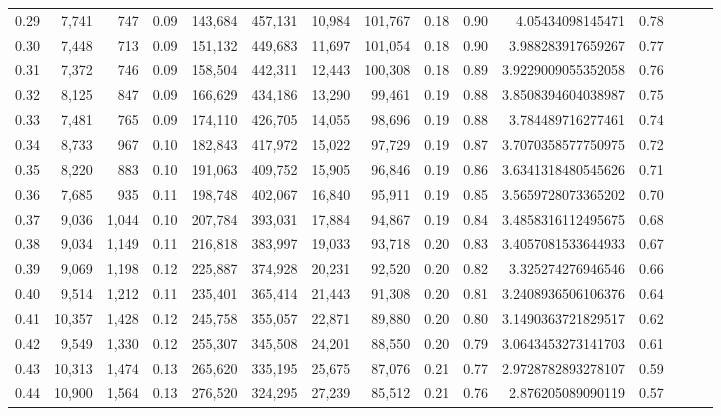 \begin{tabular}{rrrrrrrrrrrrrrr}
0.29 &   7,741 &    747 &  0.09 &  143,684 &  457,131 &   10,984 &  101,767 &  0.18 &  0.90 &      4.05434098145471 &      0.78 \\
0.30 &   7,448 &    713 &  0.09 &  151,132 &  449,683 &   11,697 &  101,054 &  0.18 &  0.90 &     3.988283917659267 &      0.77 \\
0.31 &   7,372 &    746 &  0.09 &  158,504 &  442,311 &   12,443 &  100,308 &  0.18 &  0.89 &    3.9229009055352058 &      0.76 \\
0.32 &   8,125 &    847 &  0.09 &  166,629 &  434,186 &   13,290 &   99,461 &  0.19 &  0.88 &    3.8508394604038987 &      0.75 \\
0.33 &   7,481 &    765 &  0.09 &  174,110 &  426,705 &   14,055 &   98,696 &  0.19 &  0.88 &     3.784489716277461 &      0.74 \\
0.34 &   8,733 &    967 &  0.10 &  182,843 &  417,972 &   15,022 &   97,729 &  0.19 &  0.87 &    3.7070358577750975 &      0.72 \\
0.35 &   8,220 &    883 &  0.10 &  191,063 &  409,752 &   15,905 &   96,846 &  0.19 &  0.86 &    3.6341318480545626 &      0.71 \\
0.36 &   7,685 &    935 &  0.11 &  198,748 &  402,067 &   16,840 &   95,911 &  0.19 &  0.85 &    3.5659728073365202 &      0.70 \\
0.37 &   9,036 &  1,044 &  0.10 &  207,784 &  393,031 &   17,884 &   94,867 &  0.19 &  0.84 &    3.4858316112495675 &      0.68 \\
0.38 &   9,034 &  1,149 &  0.11 &  216,818 &  383,997 &   19,033 &   93,718 &  0.20 &  0.83 &    3.4057081533644933 &      0.67 \\
0.39 &   9,069 &  1,198 &  0.12 &  225,887 &  374,928 &   20,231 &   92,520 &  0.20 &  0.82 &     3.325274276946546 &      0.66 \\
0.40 &   9,514 &  1,212 &  0.11 &  235,401 &  365,414 &   21,443 &   91,308 &  0.20 &  0.81 &    3.2408936506106376 &      0.64 \\
0.41 &  10,357 &  1,428 &  0.12 &  245,758 &  355,057 &   22,871 &   89,880 &  0.20 &  0.80 &    3.1490363721829517 &      0.62 \\
0.42 &   9,549 &  1,330 &  0.12 &  255,307 &  345,508 &   24,201 &   88,550 &  0.20 &  0.79 &    3.0643453273141703 &      0.61 \\
0.43 &  10,313 &  1,474 &  0.13 &  265,620 &  335,195 &   25,675 &   87,076 &  0.21 &  0.77 &    2.9728782893278107 &      0.59 \\
0.44 &  10,900 &  1,564 &  0.13 &  276,520 &  324,295 &   27,239 &   85,512 &  0.21 &  0.76 &     2.876205089090119 &      0.57 \\

\end{tabular}

